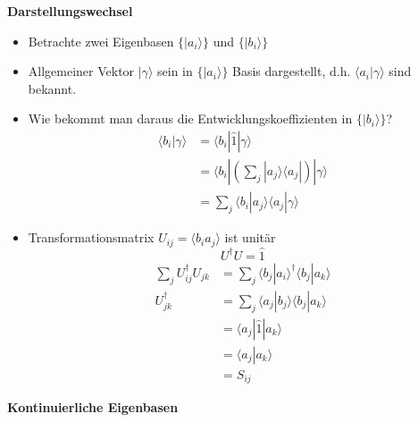 \documentclass[10pt,article,colorback,accentcolor=tud9d]{scrartcl}
\begin{document}
\textbf{Darstellungswechsel}
\begin{itemize}
	\item Betrachte zwei Eigenbasen $\{\left.\right|a_i\rangle\}$ und $\{\left.\right|b_i\rangle\}$
  \item Allgemeiner Vektor $\left.\right|\gamma\rangle$ sein in $\{\left.\right|a_i\rangle\}$ Basis dargestellt, d.h. $\langle a_i\left.\right|\gamma\rangle$ sind bekannt.
  \item Wie bekommt man daraus die Entwicklungskoeffizienten in $\{\left.\right|b_i\rangle\}$?
  \begin{equation}
  \begin{aligned}
    \langle b_i \left.\right|\gamma\rangle&=\langle b_i\left.\right|\hat{1}\left.\right|\gamma\rangle\\
    &=\langle b_i \left.\right|\left(\sum_j\left.\right|a_j\rangle\langle a_j\left.\right|\right)\left.\right|\gamma\rangle\\
    &=\sum_j\langle b_i\left.\right|a_j\rangle\langle a_j\left.\right|\gamma\rangle
  \end{aligned}
  \end{equation}
  \item Transformationsmatrix $U_{ij} =\langle b_ia_j\rangle$ ist unitär
    \begin{equation}
      U^{\dagger}U=\hat{1}
     \end{equation}
     \begin{equation}
      \begin{aligned}
      \sum_jU^{\dagger}_{ij}U_{jk}&=\sum_j\langle b_j\left.\right|a_i\rangle^{\dagger}\langle b_j\left.\right|a_k\rangle\\
      U_{jk}^{\dagger}&=\sum_j\langle a_j\left.\right|b_j\rangle\langle b_j\left.\right|a_k\rangle\\
      &=\langle a_j\left.\right|\hat{1}\left.\right|a_k\rangle\\
      &=\langle a_j\left.\right|a_k\rangle\\
      &=S_{ij}
      \end{aligned}
    \end{equation}
\end{itemize}
\textbf{Kontinuierliche Eigenbasen}
\end{document}
